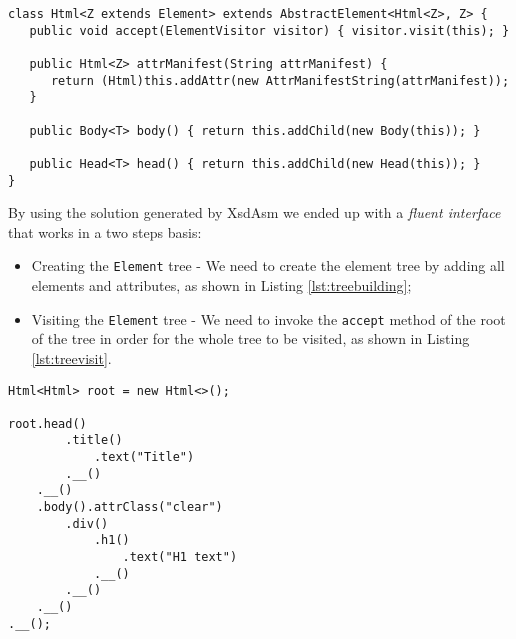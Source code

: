 \bigskip


\begin{minipage}{\linewidth}
\begin{lstlisting}[caption={Html Class Generated by XsdAsm},label={lst:htmlasm}]
class Html<Z extends Element> extends AbstractElement<Html<Z>, Z> {
   public void accept(ElementVisitor visitor) { visitor.visit(this); }
   
   public Html<Z> attrManifest(String attrManifest) {
      return (Html)this.addAttr(new AttrManifestString(attrManifest));
   }
   
   public Body<T> body() { return this.addChild(new Body(this)); }
   
   public Head<T> head() { return this.addChild(new Head(this)); }
}
\end{lstlisting}
\end{minipage}

\noindent
By using the solution generated by XsdAsm we ended up with a \textit{fluent interface} that works in a two steps basis:

\begin{itemize}  
	\item Creating the \texttt{Element} tree - We need to create the element tree by adding all elements and attributes, as shown in Listing \ref{lst:treebuilding};
	\item Visiting the \texttt{Element} tree - We need to invoke the \texttt{accept} method of the root of the tree in order for the whole tree to be visited, as shown in Listing \ref{lst:treevisit}.
\end{itemize}

\bigskip


\begin{minipage}{\linewidth}
\begin{lstlisting}[caption={HTML5 Tree Creation using XsdAsm},label={lst:treebuilding}]
Html<Html> root = new Html<>();

root.head()
        .title()
            .text("Title")
        .__()
    .__()
    .body().attrClass("clear")
        .div()
        	.h1()
        		.text("H1 text")
        	.__()
        .__()
    .__()
.__();
\end{lstlisting}
\end{minipage}

